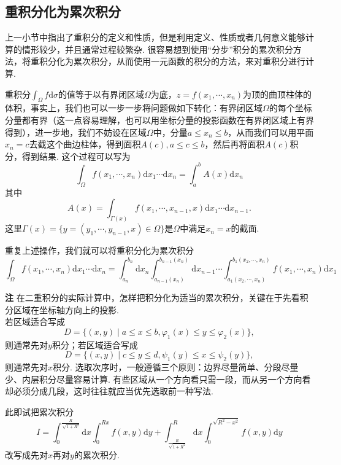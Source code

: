 \documentclass{ctexart}
\newenvironment{custom}[1]{\par\noindent \textbf{#1}\quad}{\par\vspace{1em}}
\begin{document}
\subsection{重积分化为累次积分}
上一小节中指出了重积分的定义和性质，但是利用定义、性质或者几何意义能够计算的情形较少，并且通常过程较繁杂. 很容易想到使用“分步”积分的累次积分方法，将重积分化为累次积分，从而使用一元函数的积分的方法，来对重积分进行计算.

重积分$\int_{\Omega}{f\mathrm{d}\sigma}$的值等于以有界闭区域$\Omega$为底，$z=f(x_{1},\cdots,x_{n})$为顶的曲顶柱体的体积，事实上，我们也可以一步一步将问题做如下转化：有界闭区域$\Omega$的每个坐标分量都有界（这一点容易理解，也可以用坐标分量的投影函数在有界闭区域上有界得到），进一步地，我们不妨设在区域$\Omega$中，分量$a\leqslant x_{n}\leqslant b$，从而我们可以用平面$x_{n}=c$去截这个曲边柱体，得到面积$A(c),a\leqslant c\leqslant b$，然后再将面积$A(c)$积分，得到结果. 这个过程可以写为
$$\int_{\Omega}{f(x_{1},\cdots,x_{n})\mathrm{d}x_{1}\cdots\mathrm{d}x_{n}}=\int_{a}^{b}{A(x)\mathrm{d}x_{n}}$$
其中
$$A(x)=\int_{\Gamma(x)}{f(x_{1},\cdots,x_{n-1},x)\mathrm{d}x_{1}\cdots\mathrm{d}x_{n-1}}.$$
这里$\Gamma(x)=\{y=(y_{1},\cdots,y_{n-1},x)\in \Omega\}$是$\Omega$中满足$x_{n}=x$的截面.

重复上述操作，我们就可以将重积分化为累次积分
$$\int_{\Omega}{f(x_{1},\cdots,x_{n})\mathrm{d}x_{1}\cdots\mathrm{d}x_{n}}=\int_{a_{n}}^{b_{n}}{\mathrm{d}x_{n}\int_{a_{n-1}(x_{n})}^{b_{n-1}(x_{n})}{\mathrm{d}x_{n-1}\cdots\int_{a_{1}(x_{2},\cdots,x_{n})}^{b_{1}(x_{2},\cdots,x_{n})}{f(x_{1},\cdots,x_{n})\mathrm{d}x_{1}}}}$$

\begin{custom}{注}
在二重积分的实际计算中，怎样把积分化为适当的累次积分，关键在于先看积分区域在坐标轴方向上的投影.\\
若区域适合写成
$$D=\{(x,y)\mid a\leqslant x\leqslant b,\varphi_{1}(x)\leqslant y\leqslant \varphi_{2}(x)\},$$
则通常先对$y$积分；若区域适合写成
$$D=\{(x,y)\mid c\leqslant y\leqslant d,\psi_{1}(y)\leqslant x\leqslant \psi_{2}(y)\},$$
则通常先对$x$积分. 选取次序时，一般遵循三个原则：边界尽量简单、分段尽量少、内层积分尽量容易计算. 有些区域从一个方向看只需一段，而从另一个方向看却必须分成几段，这时往往就应当优先选取前一种写法.
\end{custom}

\begin{exercise}
此即\cite[22.2.4练习题1]{XHM}试把累次积分
$$I=\int_{0}^{\frac{R}{\sqrt{1+R^{2}}}}{\mathrm{d}x\int_{0}^{Rx}{f(x,y)\mathrm{d}y}}+\int_{\frac{R}{\sqrt{1+R^{2}}}}^{R}{\mathrm{d}x\int_{0}^{\sqrt{R^{2}-x^{2}}}{f(x,y)\mathrm{d}y}}$$
改写成先对$x$再对$y$的累次积分.
\end{exercise}
\end{document}
